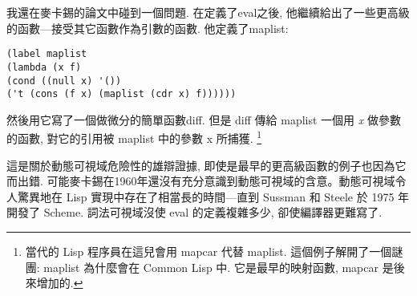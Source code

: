 \documentclass[12pt]{article}
\begin{document}
\begin{CJK}{UTF8}{bsmi}
我還在麥卡錫的論文中碰到一個問題. 
在定義了eval之後, 
他繼續給出了一些更高級的函數---接受其它函數作為引數的函數. 
他定義了maplist: 
\begin{verbatim} 
(label maplist 
(lambda (x f) 
(cond ((null x) '()) 
('t (cons (f x) (maplist (cdr x) f)))))) 
\end{verbatim} 
然後用它寫了一個做微分的簡單函數diff. 
但是 diff 傳給 maplist 一個用 {\it x} 做參數的函數, 
對它的引用被 maplist 中的參數 x 所捕獲.
\footnote{當代的 Lisp 程序員在這兒會用 mapcar 代替 maplist. 
這個例子解開了一個謎團: 
maplist 為什麼會在 Common Lisp 中. 
它是最早的映射函數, mapcar 是後來增加的.} 

這是關於動態可視域危險性的雄辯證據, 
即使是最早的更高級函數的例子也因為它而出錯. 
可能麥卡錫在1960年還沒有充分意識到動態可視域的含意。動態可視域令人驚異地在
Lisp 實現中存在了相當長的時間---直到 Sussman 和 Steele 於 1975 年開發了 Scheme. 
詞法可視域沒使 eval 的定義複雜多少, 卻使編譯器更難寫了. 
\newpage 
\end{CJK} 
\end{document}
